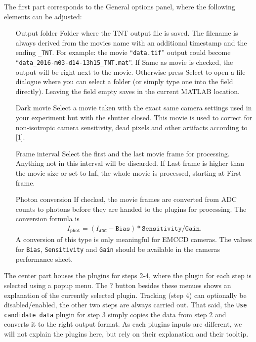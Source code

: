 \documentclass[11pt,onside]{report}
\numberwithin{equation}{chapter}
\begin{document}
The first part corresponds to the \textsf{General options} panel, where the following elements can be adjusted:
\begin{itemize}[leftmargin=3.5cm]
\item[Output folder] Folder where the TNT output file is saved. The filename is always derived from the movies name with an additional timestamp and the ending \texttt{\_TNT}. For example: the movie ``\texttt{data.tif}'' output could become ``\texttt{data\_2016-m03-d14-13h15\_TNT.mat}''. If \textsf{Same as movie} is checked, the output will be right next to the movie. Otherwise press \textsf{Select} to open a file dialogue where you can select a folder (or simply type one into the field directly). Leaving the field empty saves in the current MATLAB location.
\item[Dark movie] Select a movie taken with the exact same camera settings used in your experiment but with the shutter closed. This movie is used to correct for non-isotropic camera sensitivity, dead pixels and other artifacts according to [1].
\item[Frame interval] Select the first and the last movie frame for processing. Anything not in this interval will be discarded. If \textsf{Last frame} is higher than the movie size or set to \textsf{Inf}, the whole movie is processed, starting at \textsf{First frame}.
\item[Photon conversion]  If checked, the movie frames are converted from ADC counts to photons before they are handed to the plugins for processing. The conversion formula is
\begin{align}
I_{\texttt{phot}} = (I_{\texttt{ADC}}-\texttt{Bias})*\texttt{Sensitivity}/\texttt{Gain}.
\end{align}
A conversion of this type is only meaningful for EMCCD cameras. The values for \texttt{Bias}, \texttt{Sensitivity} and \texttt{Gain} should be available in the cameras performance sheet.
\end{itemize}

The center part houses the plugins for steps 2-4, where the plugin for each step is selected using a popup menu. The \textsf{?} button besides these menues shows an explanation of the currently selected plugin. Tracking (step 4) can optionally be disabled/enabled, the other two steps are always carried out. That said, the \texttt{Use candidate data} plugin for step 3 simply copies the data from step 2 and converts it to the right output format. As each plugins inputs are different, we will not explain the plugins here, but rely on their explanation and their tooltip.
\end{document}
